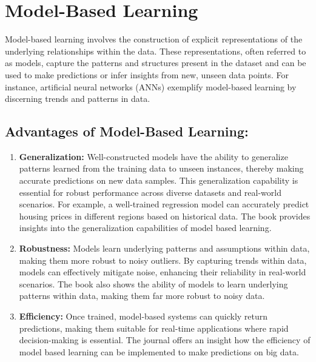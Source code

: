 \documentclass[a4paper, 12pt]{report}
\begin{document}
\section{Model-Based Learning}

Model-based learning involves the construction of explicit representations of the underlying relationships within the data.
These representations, often referred to as models, capture the patterns and structures present in the dataset and can be used to make predictions or infer insights from new, unseen data points.
For instance, artificial neural networks (ANNs) exemplify model-based learning by discerning trends and patterns in data.

\subsection{Advantages of Model-Based Learning:}
\begin{enumerate}
	\item \textbf{Generalization:} Well-constructed models have the ability to generalize patterns learned from the training data to unseen instances, thereby making accurate predictions on new data samples.
	      This generalization capability is essential for robust performance across diverse datasets and real-world scenarios.
	      For example, a well-trained regression model can accurately predict housing prices in different regions based on historical data.
          The book \cite{bishop2006pattern} provides insights into the generalization capabilities of model based learning.
	\item \textbf{Robustness:} Models learn underlying patterns and assumptions within data, making them more robust to noisy outliers.
	      By capturing trends within data, models can effectively mitigate noise, enhancing their reliability in real-world scenarios.
          The book \cite{bishop2006pattern} also shows the ability of models to learn underlying patterns within data, making them far more robust to noisy data.
	\item \textbf{Efficiency:} Once trained, model-based systems can quickly return predictions, 
           making them suitable for real-time applications where rapid decision-making is essential. 
           The journal \cite{gupta2016scalable} offers an insight how the efficiency of model based learning can be implemented to make predictions on big data.

\end{enumerate}
\end{document}
